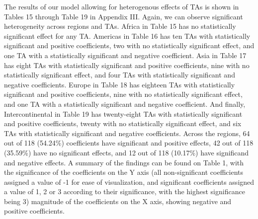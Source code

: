 The results of our model allowing for heterogenous effects of TAs is
shown in Tables 15 through Table 19 in Appendix III. Again, we can
observe significant heterogeneity across regions and TAs. Africa in
Table 15 has no statistically significant effect for any TA. Americas in
Table 16 has ten TAs with statistically significant and positive
coefficients, two with no statistically significant effect, and one TA
with a statistically significant and negative coefficient. Asia in Table
17 has eight TAs with statistically significant and positive
coefficients, nine with no statistically significant effect, and four
TAs with statistically significant and negative coefficients. Europe in
Table 18 has eighteen TAs with statistically significant and positive
coefficients, nine with no statistically significant effect, and one TA
with a statistically significant and negative coefficient. And finally,
Intercontinental in Table 19 has twenty-eight TAs with statistically
significant and positive coefficients, twenty with no statistically
significant effect, and six TAs with statistically significant and
negative coefficients. Across the regions, 64 out of 118 (54.24\%)
coefficients have significant and positive effects, 42 out of 118
(35.59\%) have no significant effects, and 12 out of 118 (10.17\%) have
significand and negative effects. A summary of the findings can be found
on Table 1, with the significance of the coefficients on the Y axis (all
non-significant coefficients assigned a value of -1 for ease of
visualization, and significant coefficients assigned a value of 1, 2 or
3 according to their significance, with the highest significance being
3) magnitude of the coefficients on the X axis, showing negative and
positive coefficients.
